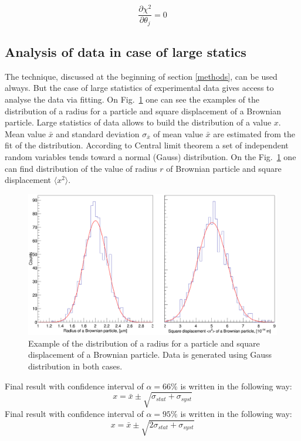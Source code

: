 \documentclass[12pt,a4paper]{report}
\begin{document}
\begin{equation} \label{chi_minimisation_condition}
\frac{\partial \chi^2}{\partial \theta_j} = 0
\end{equation}

\subsection{Analysis of data in case of large statics}
The technique, discussed at the beginning of section \ref{methods}, can be used always. But the case of large statistics of experimental data gives access to analyse the data via fitting. On Fig.~\ref{fig:radius_distribution} one can see the examples of the distribution of a radius for a particle and square displacement of a Brownian particle. Large statistics of data allows to build the distribution of a value $x$. Mean value $\bar{x}$ and standard deviation $\sigma_{\bar{x}}$ of mean value $\bar{x}$ are estimated from the fit of the distribution. According to Central limit theorem a set of independent random variables tends toward a normal (Gauss) distribution. On the Fig.~\ref{fig:radius_distribution} one can find distribution of the value of radius $r$ of Brownian particle and square displacement $\langle x^2 \rangle$.
\begin{figure}[!h]
\begin{center}
\includegraphics*[scale = 0.25]{Figures/two_plots}
\caption{\label{fig:radius_distribution} Example of the distribution of a radius for a particle and square displacement of a Brownian particle. Data is generated using Gauss distribution in both cases.}
\end{center}
\end{figure}
Final result with confidence interval of $\alpha = 66 \%$ is written in the following way:
\begin{equation}
x = \bar{x} \pm \sqrt{\sigma_{stat}+\sigma_{syst}}
\end{equation}
Final result with confidence interval of $\alpha = 95 \%$ is written in the following way:
\begin{equation} \label{error_offline}
x = \bar{x} \pm \sqrt{2\sigma_{stat}+\sigma_{syst}}
\end{equation}
\end{document}
